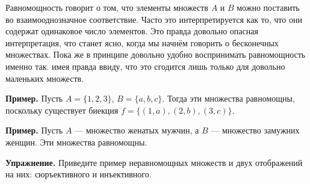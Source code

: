 Равномощность говорит о том, что элементы множеств $A$ и $B$ можно поставить во взаимооднозначное соответствие. Часто это интерпретируется как то, что они содержат одинаковое число элементов. Это правда довольно опасная интерпретация, что станет ясно, когда мы начнём говорить о бесконечных множествах. Пока же в принципе довольно удобно воспринимать равномощность именно так. имея  правда ввиду, что это сгодится лишь только для довольно маленьких множеств.

{\bfseries Пример.} Пусть $A = \{1, 2, 3\}$, $B = \{a, b, c\}$. Тогда эти множества равномощны, поскольку существует биекция $f=\{(1, a), (2, b) , (3, c)\}$.

{\bfseries Пример.} Пусть $A$ — множество женатых мужчин, а $B$ — множество замужних женщин. Эти множества равномощны.

{\bfseries Упражнение.} Приведите пример неравномощных множеств и двух отображений на них: сюръективного и инъективного.
